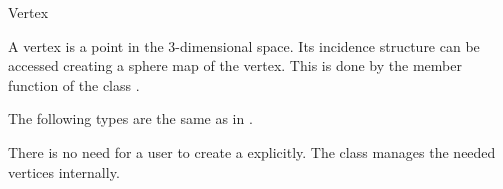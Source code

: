 
\ccRefPageBegin



\begin{ccRefClass}{Vertex}

\ccDefinition

A vertex is a point in the 3-dimensional space. Its incidence
structure can be accessed creating a sphere map of the vertex. 
This is done by the member function  of
the class .


\ccTypes
{}
\ccThreeToTwo

The following types are the same as in .


\ccCreation
{}

There is no need for a user to create a  explicitly. The
class  manages the needed vertices internally.



\ccOperations




\\

\ccTagDefaults
\end{ccRefClass}

\ccRefPageEnd
